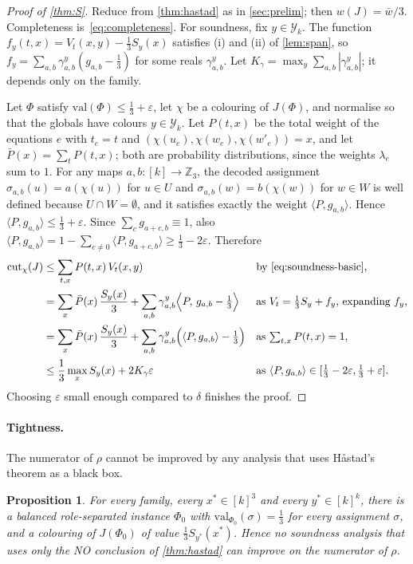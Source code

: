 \documentclass[11pt,letterpaper]{article}
\newtheorem{proposition}[theorem]{Proposition}
\theoremstyle{remark}
\newcommand{\Z}{\mathbb{Z}}
\newcommand{\eps}{\varepsilon}
\newcommand{\Y}{\mathcal{Y}}
\newcommand{\cut}{\mathrm{cut}}
\newcommand{\val}{\mathrm{val}}
\begin{document}
\begin{proof}[Proof of \cref{thm:S}]
Reduce from \cref{thm:hastad} as in \cref{sec:prelim}; then $w(J)=\bar w/3$. Completeness
is~\eqref{eq:completeness}. For soundness, fix $y\in\Y_k$. The function $f_y(t,x)=V_t(x,y)-\frac13 S_y(x)$
satisfies (i) and (ii) of \cref{lem:span}, so $f_y=\sum_{a,b}\gamma^y_{a,b}(g_{a,b}-\frac13)$ for some reals
$\gamma^y_{a,b}$. Let $K_\gamma=\max_{y}\sum_{a,b}|\gamma^y_{a,b}|$; it depends only on the family.

Let $\Phi$ satisfy $\val(\Phi)\le\frac13+\eps$, let $\chi$ be a colouring of $J(\Phi)$, and normalise so that
the globals have colours $y\in\Y_k$. Let $P(t,x)$ be the total weight of the equations $e$ with $t_e=t$
and $(\chi(u_e),\chi(w_e),\chi(w'_e))=x$, and let $\bar P(x)=\sum_tP(t,x)$; both are probability
distributions, since the weights $\lambda_e$ sum to $1$. For any maps $a,b\colon[k]\to\Z_3$, the decoded
assignment $\sigma_{a,b}(u)=a(\chi(u))$ for $u\in U$ and $\sigma_{a,b}(w)=b(\chi(w))$ for $w\in W$ is well
defined because $U\cap W=\emptyset$, and it satisfies exactly the weight $\langle P,g_{a,b}\rangle$. Hence
$\langle P,g_{a,b}\rangle\le\frac13+\eps$. Since $\sum_{c}g_{a+c,b}\equiv 1$, also
$\langle P,g_{a,b}\rangle = 1-\sum_{c\neq 0}\langle P,g_{a+c,b}\rangle \ge\frac13-2\eps$. Therefore
\begin{align*}
  \cut_\chi(J) &\le \sum_{t,x}P(t,x)\,V_t(x,y)
     &&\text{by \eqref{eq:soundness-basic},}\\
  &= \sum_x \bar P(x)\,\frac{S_y(x)}{3}+\sum_{a,b}\gamma^y_{a,b}\Big\langle P,\,g_{a,b}-\tfrac13\Big\rangle
     &&\text{as $V_t=\tfrac13S_y+f_y$, expanding $f_y$,}\\
  &= \sum_x \bar P(x)\,\frac{S_y(x)}{3}+\sum_{a,b}\gamma^y_{a,b}\Big(\langle P,g_{a,b}\rangle-\tfrac13\Big)
     &&\text{as $\textstyle\sum_{t,x}P(t,x)=1$,}\\
  &\le \frac13\max_x S_y(x) + 2K_\gamma\eps
     &&\text{as $\langle P,g_{a,b}\rangle\in[\tfrac13-2\eps,\tfrac13+\eps]$.}
\end{align*}
Choosing $\eps$ small enough compared to $\delta$ finishes the proof.
\end{proof}

\paragraph{Tightness.}
The numerator of $\rho$ cannot be improved by any analysis that uses H\aa stad's theorem as a black box.

\begin{proposition}\label{prop:tight}
For every family, every $x^\ast\in[k]^3$ and every $y^\ast\in[k]^k$, there is a balanced role-separated
instance $\Phi_0$ with $\val_{\Phi_0}(\sigma)=\frac13$ for every assignment $\sigma$, and a colouring of
$J(\Phi_0)$ of value $\frac13S_{y^\ast}(x^\ast)$. Hence no soundness analysis that uses only the NO
conclusion of \cref{thm:hastad} can improve on the numerator of $\rho$.
\end{proposition}
\end{document}
